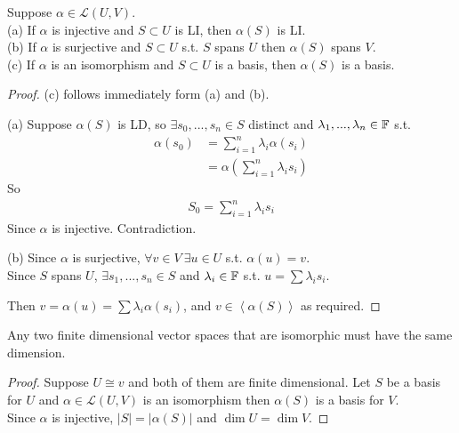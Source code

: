 \documentclass[a4paper]{article}
\begin{document}
\begin{prop}
Suppose $\alpha \in \mathcal{L}\left(U,V\right)$.\\
(a) If $\alpha$ is injective and $S \subset U$ is LI, then $\alpha\left(S\right)$ is LI.\\
(b) If $\alpha$ is surjective and $S \subset U$ s.t. $S$ spans $U$ then $\alpha\left(S\right)$ spans $V$.\\
(c) If $\alpha$ is an isomorphism and $S \subset U$ is a basis, then $\alpha\left(S\right)$ is a basis.
\begin{proof}
(c) follows immediately form (a) and (b).

(a) Suppose $\alpha\left(S\right)$ is LD, so $\exists s_0,...,s_n \in S$ distinct and $\lambda_1,...,\lambda_n \in \mathbb{F}$ s.t.
\begin{equation*}
\begin{aligned}
\alpha\left(s_0\right) &= \sum_{i=1}^n \lambda_i \alpha\left(s_i\right)\\
&= \alpha\left(\sum_{i=1}^n \lambda_i s_i\right)
\end{aligned}
\end{equation*}
So
\begin{equation*}
\begin{aligned}
S_0 = \sum_{i=1}^n \lambda_i s_i
\end{aligned}
\end{equation*}
Since $\alpha$ is injective. Contradiction.

(b) Since $\alpha$ is surjective, $\forall v \in V \ \exists u \in U$ s.t. $\alpha\left(u\right) = v$.\\
Since $S$ spans $U$, $\exists s_1,...,s_n\in S$ and $\lambda_i \in \mathbb{F}$ s.t. $u = \sum \lambda_i s_i$.

Then $v = \alpha\left(u\right) = \sum \lambda_i \alpha\left(s_i\right)$, and $v \in \left<\alpha\left(S\right)\right>$ as required.
\end{proof}
\end{prop}

\begin{coro}
Any two finite dimensional vector spaces that are isomorphic must have the same dimension.
\begin{proof}
Suppose $U \cong v$ and both of them are finite dimensional. Let $S$ be a basis for $U$ and $\alpha\in\mathcal{L}\left(U,V\right)$ is an isomorphism then $\alpha\left(S\right)$ is a basis for $V$.\\
Since $\alpha$ is injective, $|S| = |\alpha\left(S\right)|$ and $\dim U = \dim V$.
\end{proof}
\end{coro}
\end{document}
